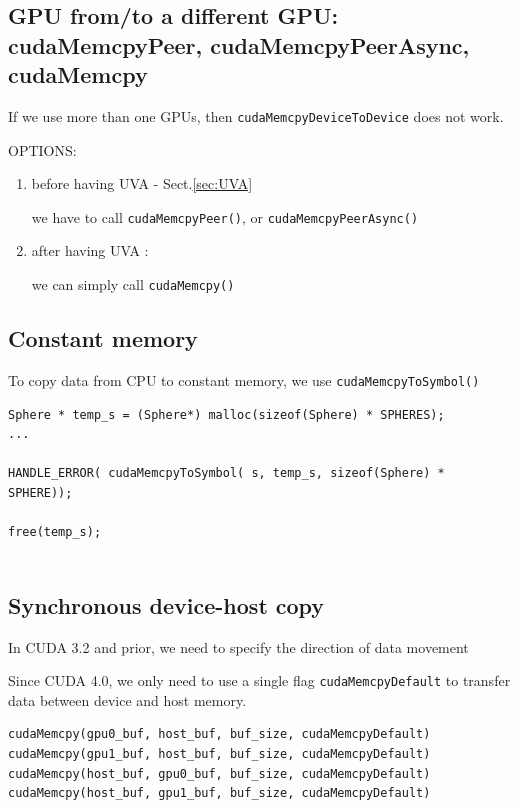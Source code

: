 \subsection{GPU from/to a different GPU: cudaMemcpyPeer, cudaMemcpyPeerAsync, cudaMemcpy}
\label{sec:cudaMemcpyPeer}
\label{sec:cudaMemcpyPeerAsync}

If we use more than one GPUs, then \verb!cudaMemcpyDeviceToDevice! does not work.

OPTIONS:
\begin{enumerate}
  \item before having UVA - Sect.\ref{sec:UVA}
  
  we have to call \verb!cudaMemcpyPeer()!, or 
  \verb!cudaMemcpyPeerAsync()! 
  
  \item after having UVA :
  
  we can simply call \verb!cudaMemcpy()!
  
\end{enumerate}


\subsection{Constant memory}
\label{sec:cudac_copy-constant}

To copy data from CPU to constant memory, we use
\verb!cudaMemcpyToSymbol()!
\begin{lstlisting}
Sphere * temp_s = (Sphere*) malloc(sizeof(Sphere) * SPHERES);
...

HANDLE_ERROR( cudaMemcpyToSymbol( s, temp_s, sizeof(Sphere) * SPHERE));

free(temp_s);


\end{lstlisting}


\subsection{Synchronous device-host copy}
\label{sec:cudac_synch_datacopy}

In CUDA 3.2 and prior, we need to specify the direction of data movement


Since CUDA 4.0, we only need to use a single flag \verb!cudaMemcpyDefault! to
transfer data between device and host memory.

\begin{lstlisting}
cudaMemcpy(gpu0_buf, host_buf, buf_size, cudaMemcpyDefault)
cudaMemcpy(gpu1_buf, host_buf, buf_size, cudaMemcpyDefault)
cudaMemcpy(host_buf, gpu0_buf, buf_size, cudaMemcpyDefault)
cudaMemcpy(host_buf, gpu1_buf, buf_size, cudaMemcpyDefault)
\end{lstlisting}

